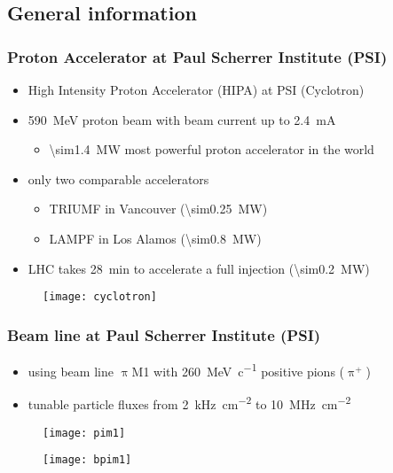 \subsection{General information}
\begin{frame}
	\frametitle{Proton Accelerator at Paul Scherrer Institute (PSI)}
	\begin{itemize}
		\setlength{\itemsep}{\fill}
		\item High Intensity Proton Accelerator (HIPA) at PSI (Cyclotron)
		\item \SI{590}{\mega\electronvolt} proton beam with beam current up to \SI{2.4}{\milli\ampere}
		\begin{itemize}
			\vspace*{4pt}
			\item \SI{\sim1.4}{\mega\watt} \ra most powerful proton accelerator in the world
		\end{itemize}
		\vspace*{4pt}
		\item only two comparable accelerators
		\begin{itemize}
			\vspace*{4pt}
			\item TRIUMF in Vancouver (\SI{\sim0.25}{\mega\watt})
			\item LAMPF in Los Alamos (\SI{\sim0.8}{\mega\watt})
		\end{itemize}
		\item LHC takes \SI{28}{\minute} to accelerate a full injection (\SI{\sim0.2}{\mega\watt})
	\end{itemize}
	\begin{figure}
		\centering
		\texttt{[image: cyclotron]}
	\end{figure}
\end{frame}
\begin{frame}
	\frametitle{Beam line at Paul Scherrer Institute (PSI)}
	\begin{minipage}[c][.6\textheight]{6.5cm}
		\begin{itemize}
			\setlength{\itemsep}{\fill}
			\item using beam line $\uppi$M1 with \SI{260}{\mega\electronvolt\per c} positive pions ($\uppi^+$)
			\item tunable particle fluxes from \SI{2}{\kilo\hertz\per cm^2} to \SI{10}{\mega\hertz\per cm^2}
		\end{itemize}
		\begin{figure}
			\centering
			\texttt{[image: pim1]}
		\end{figure}
	\end{minipage}
	\begin{minipage}{4.5cm}
		\begin{figure}
			\centering
			\texttt{[image: bpim1]}
		\end{figure}
	\end{minipage}
\end{frame}
